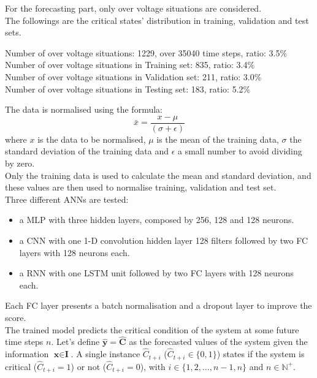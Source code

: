 For the forecasting part, only over voltage situations are considered. \\
The followings are the critical states' distribution in training, validation and test sets.
\begin{algorithm}[h]
    \State Number of over voltage situations: 1229, over 35040 time steps, ratio: 3.5\% \\
    
    \State Number of over voltage situations in Training set: 835, ratio: 3.4\%\\
    \State Number of over voltage situations in Validation set: 211, ratio: 3.0\%\\
    \State Number of over voltage situations in Testing set: 183, ratio: 5.2\%
\end{algorithm}

The data is normalised using the formula:
\[
\bar{x} = \frac{x - \mu}{(\sigma + \epsilon)}
\]
\noindent where $x$ is the data to be normalised, $\mu$ is the mean of the training data, $\sigma$ the standard deviation of the training data and $\epsilon$ a small number to avoid dividing by zero.\\
Only the training data is used to calculate the mean and standard deviation, and these values are then used to normalise training, validation and test set.\\

Three different \glspl{ANN} are tested:
\begin{itemize}
    \item a \gls{MLP} with three hidden layers, composed by 256, 128 and 128 neurons.
    \item a \gls{CNN} with one 1-D convolution hidden layer 128 filters followed by two \gls{FC} layers with 128 neurons each.
    \item a \gls{RNN} with one \gls{LSTM} unit followed by two \gls{FC} layers with 128 neurons each.
\end{itemize}
\noindent Each \gls{FC} layer presents a batch normalisation and a dropout layer to improve the score.\\

The trained model predicts the critical condition of the system at some future time steps $n$. Let's define $\hat{\textbf{y}} = \hat{\textbf{C}}$ as the forecasted values of the system given the information $\textbf{x} \in \textbf{I}$. A single instance $\hat{C}_{t+i}$ ($\hat{C}_{t+i} \in \{0,1\}$) states if the system is critical ($\hat{C}_{t+i}=1$) or not ($\hat{C}_{t+i}=0$), with $i \in \{1,2,\dots,n-1,n\}$ and $n \in \mathbb{N}^+$.\\

